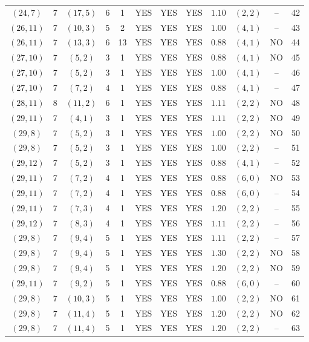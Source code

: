 \begin{longtable}{|c|c|c|c|c|c|c|c|c|c|c|c|}
$(24,7)$ & 7 & $(17,5)$ & 6 & 1 & YES & YES & YES & $1.10$ & $(2,2)$ & -- & 42\\
$(26,11)$ & 7 & $(10,3)$ & 5 & 2 & YES & YES & YES & $1.00$ & $(4,1)$ & -- & 43\\
$(26,11)$ & 7 & $(13,3)$ & 6 & 13 & YES & YES & YES & $0.88$ & $(4,1)$ & NO & 44\\
$(27,10)$ & 7 & $(5,2)$ & 3 & 1 & YES & YES & YES & $0.88$ & $(4,1)$ & NO & 45\\
$(27,10)$ & 7 & $(5,2)$ & 3 & 1 & YES & YES & YES & $1.00$ & $(4,1)$ & -- & 46\\
$(27,10)$ & 7 & $(7,2)$ & 4 & 1 & YES & YES & YES & $0.88$ & $(4,1)$ & -- & 47\\
$(28,11)$ & 8 & $(11,2)$ & 6 & 1 & YES & YES & YES & $1.11$ & $(2,2)$ & NO & 48\\
$(29,11)$ & 7 & $(4,1)$ & 3 & 1 & YES & YES & YES & $1.11$ & $(2,2)$ & NO & 49\\
$(29,8)$ & 7 & $(5,2)$ & 3 & 1 & YES & YES & YES & $1.00$ & $(2,2)$ & NO & 50\\
$(29,8)$ & 7 & $(5,2)$ & 3 & 1 & YES & YES & YES & $1.00$ & $(2,2)$ & -- & 51\\
$(29,12)$ & 7 & $(5,2)$ & 3 & 1 & YES & YES & YES & $0.88$ & $(4,1)$ & -- & 52\\
$(29,11)$ & 7 & $(7,2)$ & 4 & 1 & YES & YES & YES & $0.88$ & $(6,0)$ & NO & 53\\
$(29,11)$ & 7 & $(7,2)$ & 4 & 1 & YES & YES & YES & $0.88$ & $(6,0)$ & -- & 54\\
$(29,11)$ & 7 & $(7,3)$ & 4 & 1 & YES & YES & YES & $1.20$ & $(2,2)$ & -- & 55\\
$(29,12)$ & 7 & $(8,3)$ & 4 & 1 & YES & YES & YES & $1.11$ & $(2,2)$ & -- & 56\\
$(29,8)$ & 7 & $(9,4)$ & 5 & 1 & YES & YES & YES & $1.11$ & $(2,2)$ & -- & 57\\
$(29,8)$ & 7 & $(9,4)$ & 5 & 1 & YES & YES & YES & $1.30$ & $(2,2)$ & NO & 58\\
$(29,8)$ & 7 & $(9,4)$ & 5 & 1 & YES & YES & YES & $1.20$ & $(2,2)$ & NO & 59\\
$(29,11)$ & 7 & $(9,2)$ & 5 & 1 & YES & YES & YES & $0.88$ & $(6,0)$ & -- & 60\\
$(29,8)$ & 7 & $(10,3)$ & 5 & 1 & YES & YES & YES & $1.00$ & $(2,2)$ & NO & 61\\
$(29,8)$ & 7 & $(11,4)$ & 5 & 1 & YES & YES & YES & $1.20$ & $(2,2)$ & NO & 62\\
$(29,8)$ & 7 & $(11,4)$ & 5 & 1 & YES & YES & YES & $1.20$ & $(2,2)$ & -- & 63\\

\end{longtable}
